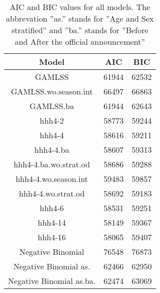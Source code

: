 \begin{table}[ht]
\centering
\caption{AIC and BIC values for all models.
    The abbrevation ''as.'' stands for ''Age and Sex stratified'' and ''ba.''
    stands for ''Before and After the official announcement''} 
\label{TabelMods}
\begin{tabular}{ccc}
  \hline
Model & AIC & BIC \\ 
  \hline
GAMLSS & 61944 & 62532 \\ 
  GAMLSS.wo.season.int & 66497 & 66863 \\ 
  GAMLSS.ba & 61944 & 62643 \\ 
  hhh4-2 & 58773 & 59244 \\ 
  hhh4-4 & 58616 & 59211 \\ 
  hhh4-4.ba & 58607 & 59313 \\ 
  hhh4-4.ba.wo.strat.od & 58686 & 59288 \\ 
  hhh4-4.wo.season.int & 59483 & 59857 \\ 
  hhh4-4.wo.strat.od & 58692 & 59183 \\ 
  hhh4-6 & 58531 & 59251 \\ 
  hhh4-14 & 58149 & 59367 \\ 
  hhh4-16 & 58065 & 59407 \\ 
  Negative Binomial  & 76548 & 76873 \\ 
  Negative Binomial as. & 62466 & 62950 \\ 
  Negative Binomial as.ba. & 62474 & 63069 \\ 
   \hline
\end{tabular}
\end{table}
